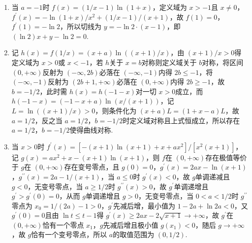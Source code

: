 \begin{solution}
\begin{enumerate}\item 当 \(a=-1\)时 \(f\left(x\right)=\left(1/x-1\right)\ln\left(1+x\right)\)，定义域为 \(x>-1\)且 \(x\ne 0\)，\(f^{\prime}\left(x\right)=-\ln\left(1+x\right)/x^{2}+\left(1/x-1\right)/\left(x+1\right)\)，故 \(f\left(1\right)=0\)，\(f^{\prime}\left(1\right)=-\ln 2\)，所以切线为 \(y=-\ln 2\cdot\left(x-1\right)\)，即 \(\left(\ln 2\right)x+y-\ln 2=0\).\item 记 \(h\left(x\right)=f\left(1/x\right)=\left(x+a\right)\ln\left(\left(x+1\right)/x\right)\)，由 \(\left(x+1\right)/x>0\)得定义域为 \(x>0\)或 \(x<-1\)，若 \(h\)关于 \(x=b\)对称则定义域关于 \(b\)对称，将区间 \(\left(0,+\infty\right)\)反射为 \(\left(-\infty,2b\right)\)必落在 \(\left(-\infty,-1\right)\)内得 \(2b\le -1\)，将 \(\left(-\infty,-1\right)\)反射为 \(\left(2b+1,+\infty\right)\)必落在 \(\left(0,+\infty\right)\)内得 \(2b\ge -1\)，故 \(b=-1/2\)，此时需 \(h\left(x\right)=h\left(-1-x\right)\)对一切 \(x>0\)成立，而 \(h\left(-1-x\right)=\left(-1-x+a\right)\ln\left(x/\left(x+1\right)\right)\)，记 \(L=\ln\left(\left(x+1\right)/x\right)>0\)，则条件化为 \(\left(x+a\right)L=\left(1+x-a\right)L\)，故 \(a=1/2\)，反之当 \(a=1/2\)，\(b=-1/2\)时定义域对称且上式恒成立，所以存在 \(a=1/2\)，\(b=-1/2\)使得曲线对称.\item 当 \(x>0\)时 \(f^{\prime}\left(x\right)=\left[-\left(x+1\right)\ln\left(x+1\right)+x+ax^{2}\right]/\left[x^{2}\left(x+1\right)\right]\)，记 \(g\left(x\right)=ax^{2}+x-\left(x+1\right)\ln\left(x+1\right)\)，则 \(f\)在 \(\left(0,+\infty\right)\)存在极值等价于 \(g\)在 \(\left(0,+\infty\right)\)存在变号零点，且 \(g\left(0\right)=0\)，\(g^{\prime}\left(x\right)=2ax-\ln\left(x+1\right)\)，\(g^{\prime\prime}\left(x\right)=2a-1/\left(x+1\right)\)，当 \(a\le 0\)时 \(g^{\prime}\left(x\right)<0\)，故 \(g\)单调递减且 \(g<0\)，无变号零点，当 \(a\ge 1/2\)时 \(g^{\prime\prime}\left(x\right)>0\)，故 \(g^{\prime}\)单调递增且 \(g^{\prime}>g^{\prime}\left(0\right)=0\)，从而 \(g\)单调递增且 \(g>0\)，无变号零点，当 \(0<a<1/2\)时 \(g^{\prime\prime}\)零点为 \(x_{0}=1/\left(2a\right)-1>0\)，\(g^{\prime}\)先减后增，最小值为 \(1-2a+\ln 2a<0\)，又 \(g^{\prime}\left(0\right)=0\)且由 \(\ln t\le t-1\)得 \(g^{\prime}\left(x\right)\ge 2ax-2\sqrt{x+1}\to+\infty\)，故 \(g^{\prime}\)在 \(\left(0,+\infty\right)\)恰有一个零点 \(x_{1}\)，\(g\)先减后增且极小值 \(g\left(x_{1}\right)<0\)，随后 \(g\to+\infty\)，故 \(g\)恰有一个变号零点，所以 \(a\)的取值范围为 \(\left(0,1/2\right)\).\end{enumerate}
\end{solution}

